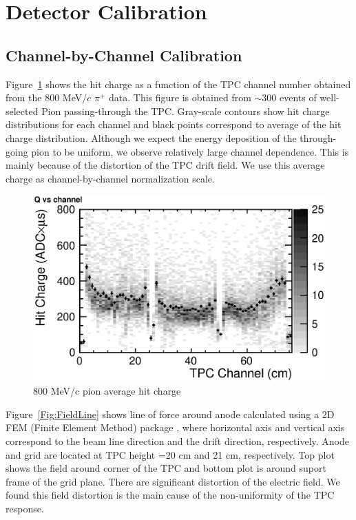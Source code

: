 \section{Detector Calibration}

\subsection{Channel-by-Channel Calibration}

Figure~\ref{fig:PionQvsCh} shows the hit charge as a function of 
the TPC channel number obtained from the 800 MeV/$c$ $\pi^+$ data. 
This figure is obtained from $\sim$300 events of well-selected Pion passing-through the TPC.
Gray-scale contours show hit charge distributions for
each channel and black points correspond to average of the hit charge distribution.  
Although we expect the energy deposition of the through-going pion to be uniform,
we observe relatively large channel dependence. 
This is mainly because of the distortion of the TPC drift field.
We use this average charge as channel-by-channel normalization scale.

\begin{figure}[htbp]
 \begin{center}
  \includegraphics[width=1.0\hsize]{fig/PionQvsCh.eps}
 \end{center}
 \caption{800 MeV/c pion average hit charge}
 \label{fig:PionQvsCh}
\end{figure}

Figure~\ref{Fig:FieldLine} shows line of force around anode  calculated using 
a 2D FEM (Finite Element Method) package \cite{Ref:FEMTET},
where horizontal axis and vertical axis correspond to the beam line direction and 
the drift direction, respectively.
Anode and grid are located at TPC height =20 cm and 21 cm, respectively.
Top plot shows the field around corner of the TPC
and bottom plot is around suport frame of the grid plane.
There are significant distortion of the electric field.
We found this field distortion is the main cause of the
non-uniformity of the TPC response.

